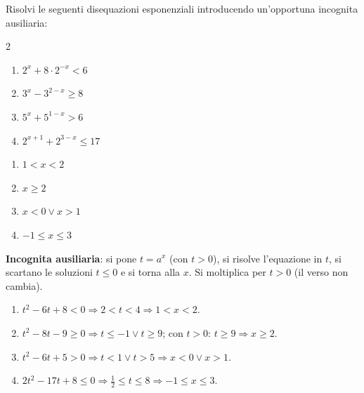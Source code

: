 
\begin{question}[ID=5.8, subtitle={Disequazioni con sostituzione: esponenti opposti}, difficulty=difficile, tags={disequazioni, esponenziali, sostituzione}]
Risolvi le seguenti disequazioni esponenziali introducendo un'opportuna incognita ausiliaria:
\begin{center}\begin{minipage}{0.92\linewidth}
\begin{multicols}{2}
\begin{enumerate}[leftmargin=3.2cm]
\item $2^{x} + 8 \cdot 2^{-x} < 6$
\item $3^{x} - 3^{2-x} \geq 8$
\item $5^{x} + 5^{1-x} > 6$
\item $2^{x+1} + 2^{3-x} \leq 17$
\end{enumerate}
\end{multicols}
\end{minipage}\end{center}
\begin{solution}
\begin{enumerate}
    \item $1<x<2$
    \item $x\geq2$
    \item $x<0\vee x>1$
    \item $-1\leq x\leq3$
\end{enumerate}
\end{solution}
\begin{explanation}
\textbf{Incognita ausiliaria}: si pone $t=a^x$ (con $t>0$), si risolve l'equazione in $t$, si scartano le soluzioni $t\leq0$ e si torna alla $x$.
Si moltiplica per $t>0$ (il verso non cambia).
\begin{enumerate}
    \item $t^2-6t+8<0 \Rightarrow 2<t<4 \Rightarrow 1<x<2$.
    \item $t^2-8t-9\geq0 \Rightarrow t\leq-1 \vee t\geq9$; con $t>0$: $t\geq9 \Rightarrow x\geq2$.
    \item $t^2-6t+5>0 \Rightarrow t<1 \vee t>5 \Rightarrow x<0 \vee x>1$.
    \item $2t^2-17t+8\leq0 \Rightarrow \tfrac12\leq t\leq8 \Rightarrow -1\leq x\leq3$.
\end{enumerate}
\end{explanation}
\end{question}


